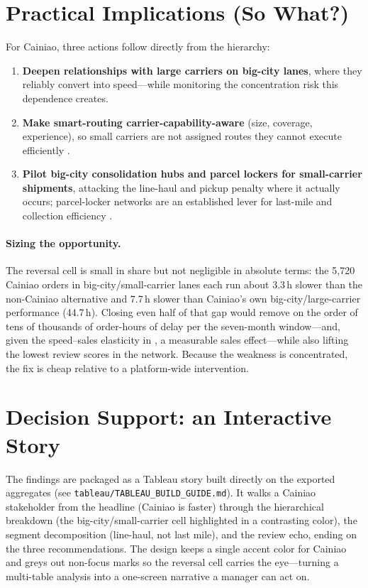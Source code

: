 \documentclass[11pt]{article}
\begin{document}
\section{Practical Implications (So What?)}
For Cainiao, three actions follow directly from the hierarchy:
\begin{enumerate}[leftmargin=1.5em,itemsep=2pt]
  \item \textbf{Deepen relationships with large carriers on big-city lanes}, where
  they reliably convert into speed---while monitoring the concentration risk this
  dependence creates.
  \item \textbf{Make smart-routing carrier-capability-aware} (size, coverage,
  experience), so small carriers are not assigned routes they cannot execute
  efficiently \citep{koc2016}.
  \item \textbf{Pilot big-city consolidation hubs and parcel lockers for
  small-carrier shipments}, attacking the line-haul and pickup penalty where it
  actually occurs; parcel-locker networks are an established lever for last-mile
  and collection efficiency \citep{deutsch2018}.
\end{enumerate}

\paragraph{Sizing the opportunity.} The reversal cell is small in share but not
negligible in absolute terms: the 5{,}720 Cainiao orders in big-city/small-carrier
lanes each run about 3.3\,h slower than the non-Cainiao alternative and 7.7\,h
slower than Cainiao's own big-city/large-carrier performance (44.7\,h). Closing
even half of that gap would remove on the order of tens of thousands of
order-hours of delay per the seven-month window---and, given the speed--sales
elasticity in \citet{fisher2019}, a measurable sales effect---while also lifting
the lowest review scores in the network. Because the weakness is concentrated, the
fix is cheap relative to a platform-wide intervention.

\section{Decision Support: an Interactive Story}
The findings are packaged as a Tableau story built directly on the exported
aggregates (see \texttt{tableau/TABLEAU\_BUILD\_GUIDE.md}). It walks a Cainiao
stakeholder from the headline (Cainiao is faster) through the hierarchical
breakdown (the big-city/small-carrier cell highlighted in a contrasting color),
the segment decomposition (line-haul, not last mile), and the review echo, ending
on the three recommendations. The design keeps a single accent color for Cainiao
and greys out non-focus marks so the reversal cell carries the eye---turning a
multi-table analysis into a one-screen narrative a manager can act on.
\end{document}
